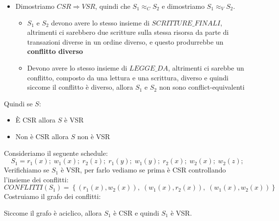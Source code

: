 \documentclass[a4paper,twoside]{article}
\begin{document}
\begin{theorem}
\begin{itemize}
\begin{figure}[H]
        \end{figure}

      \item Dimostriamo \( CSR \Rightarrow VSR \), quindi che \( S_1 \approx_C S_2 \) 
        e dimostriamo \( S_1 \approx_V S_2 \).

        \begin{itemize}
          \item 
            \( S_1 \) e \( S_2 \) devono avere lo stesso insieme di \( SCRITTURE\_FINALI \),
            altrimenti ci sarebbero due scritture sulla stessa risorsa da parte
            di transazioni diverse in un ordine diverso, e questo produrrebbe un
            \textbf{ conflitto diverso}

          \item Devono avere lo stesso insieme di \( LEGGE\_DA \), altrimenti ci sarebbe
            un conflitto, composto da una lettura e una scrittura, diverso e quindi
            siccome il conflitto è diverso, allora \( S_1 \) e \( S_2 \) non sono
            conflict-equivalenti
        \end{itemize}
  \end{itemize}
  Quindi se \( S \):
  \begin{itemize}
    \item È CSR allora \( S \) è VSR
    \item Non è CSR allora \( S \) non è VSR
  \end{itemize}
\end{theorem}

\begin{example}
  Consideriamo il seguente schedule:
  \[
    S_1 = r_1(x); \; w_1(x); \; r_2(z); \; r_1(y); \; w_1(y); \; r_2(x); \; w_2(x); \;
    w_2(z);
  \] 
  Verifichiamo se \( S_1 \) è VSR, per farlo vediamo se prima è CSR controllando
  l'insieme dei conflitti:
  \[
    CONFLITTI(S_1) = \left\{ (r_1(x), w_2(x)),\; (w_1(x), r_2(x)),\; (w_1(x), w_2(x)) \right\}
  \] 
  Costruiamo il grafo dei conflitti:
  \begin{figure}[H]
    \centering
  \end{figure}
  \noindent
  Siccome il grafo è aciclico, allora \( S_1 \) è CSR e quindi \( S_1 \) è VSR.
\end{example}
\end{document}

